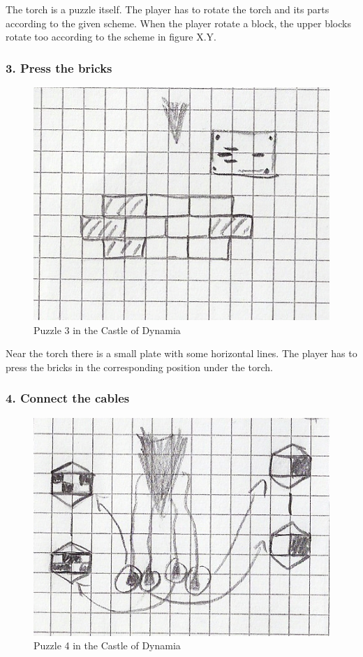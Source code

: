 The torch is a puzzle itself. The player has to rotate the torch and its parts according to the given scheme. When the player rotate a block, the upper blocks rotate too according to the scheme in figure X.Y.

\subsubsection*{3. Press the bricks}

\begin{figure}[H]
  \centering
  \includegraphics[width=\textwidth]{Images/Puzzles/castleOfDynamia_3}
  \caption{Puzzle 3 in the Castle of Dynamia}
\end{figure}

Near the torch there is a small plate with some horizontal lines. The player has to press the bricks in the corresponding position under the torch.

\subsubsection*{4. Connect the cables}

\begin{figure}[H]
  \centering
  \includegraphics[width=\textwidth]{Images/Puzzles/castleOfDynamia_4}
  \caption{Puzzle 4 in the Castle of Dynamia}
\end{figure}


